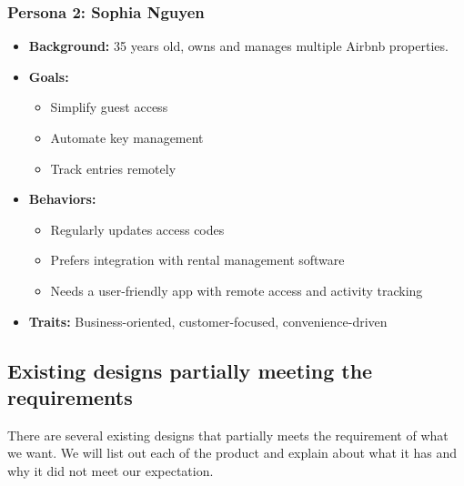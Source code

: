 \subsubsection*{Persona 2: Sophia Nguyen}

\begin{itemize}
    \item \textbf{Background:} 35 years old, owns and manages multiple Airbnb properties.
    \item \textbf{Goals:}
    \begin{itemize}
        \item Simplify guest access
        \item Automate key management
        \item Track entries remotely
    \end{itemize}
    \item \textbf{Behaviors:}
    \begin{itemize}
        \item Regularly updates access codes
        \item Prefers integration with rental management software
        \item Needs a user-friendly app with remote access and activity tracking
    \end{itemize}
    \item \textbf{Traits:} Business-oriented, customer-focused, convenience-driven
\end{itemize}


\subsection{Existing designs partially meeting the requirements}
There are several existing designs that partially meets the requirement of what we want. We will list out each of the product and explain about what it has and why it did not meet our expectation.

